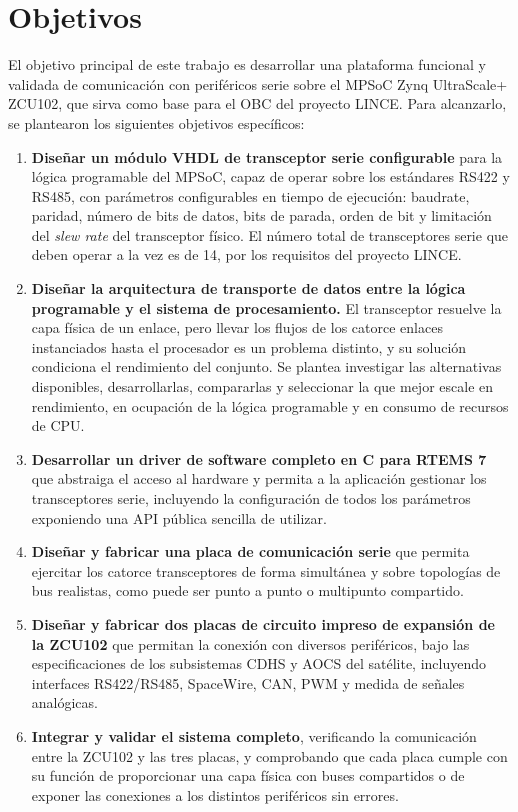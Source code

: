 \section{Objetivos} \label{objetivos}

El objetivo principal de este trabajo es desarrollar una plataforma funcional y validada de
comunicación con periféricos serie sobre el MPSoC Zynq UltraScale+ ZCU102, que sirva
como base para el OBC del proyecto LINCE. Para alcanzarlo, se plantearon los siguientes
objetivos específicos:

\begin{enumerate}
    \item \textbf{Diseñar un módulo VHDL de transceptor serie configurable} para la lógica
    programable del MPSoC, capaz de operar sobre los estándares RS422 y RS485, con
    parámetros configurables en tiempo de ejecución: baudrate, paridad, número de bits de
    datos, bits de parada, orden de bit y limitación del \textit{slew rate} del transceptor
    físico. El número total de transceptores serie que deben operar a la vez es de 14,
    por los requisitos del proyecto LINCE.

    \item \textbf{Diseñar la arquitectura de transporte de datos entre la lógica programable y el
    sistema de procesamiento.} El transceptor resuelve la capa física de un enlace, pero llevar
    los flujos de los catorce enlaces instanciados hasta el procesador es un problema
    distinto, y su solución condiciona el rendimiento del conjunto. Se plantea investigar 
    las alternativas disponibles, desarrollarlas, compararlas y seleccionar la que mejor escale 
    en rendimiento, en ocupación de la lógica programable y en consumo de recursos de CPU.

    \item \textbf{Desarrollar un driver de software completo en C para RTEMS 7} que abstraiga el
    acceso al hardware y permita a la aplicación gestionar los transceptores serie,
    incluyendo la configuración de todos los parámetros exponiendo una API pública 
    sencilla de utilizar.

    \item \textbf{Diseñar y fabricar una placa de comunicación serie}
    que permita ejercitar los catorce transceptores de forma simultánea y sobre topologías de bus
    realistas, como puede ser punto a punto o multipunto compartido.

    \item \textbf{Diseñar y fabricar dos placas de circuito impreso de expansión de la ZCU102} que
    permitan la conexión con diversos periféricos, bajo las especificaciones de los subsistemas
    CDHS y AOCS del satélite, incluyendo interfaces RS422/RS485, SpaceWire, CAN, PWM y medida de
    señales analógicas.

    \item \textbf{Integrar y validar el sistema completo}, verificando la comunicación entre la
    ZCU102 y las tres placas, y comprobando que cada placa cumple con su función de proporcionar 
    una capa física con buses compartidos o de exponer
    las conexiones a los distintos periféricos sin errores.
\end{enumerate}

